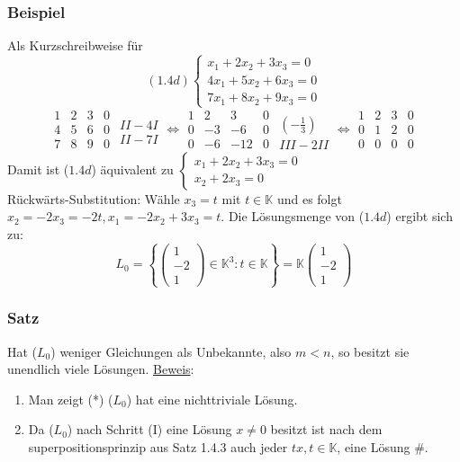 \subsubsection{Beispiel}
Als Kurzschreibweise für \[(1.4d)\begin{cases}x_1+2x_2+3x_3=0\\ 4x_1+5x_2+6x_3=0\\ 7x_1+8x_2+9x_3=0\end{cases}\]
\[\begin{array}{ccc|c}1 & 2 & 3 & 0\\ 4 & 5 & 6 & 0\\ 7 & 8 & 9 & 0\end{array} \begin{array}{c} \\ II - 4I\\ II-7I\end{array} \Leftrightarrow \begin{array}{ccc|c}1 & 2 & 3 & 0\\ 0 & -3 & -6 & 0\\ 0 & -6 & -12 & 0\end{array} \begin{array}{c} \\ (-\frac{1}{3})\\ III-2II\end{array} \Leftrightarrow \begin{array}{ccc|c}1 & 2 & 3 & 0\\ 0 & 1 & 2 & 0\\ 0 & 0 & 0 & 0\end{array}\]
Damit ist ($1.4d$) äquivalent zu $\begin{cases}x_1+2x_2+3x_3=0\\ x_2+2x_3=0\end{cases}$\\
Rückwärts-Substitution: Wähle $x_3=t$ mit $t\in\mathbb{K}$ und es folgt $x_2=-2x_3=-2t,x_1=-2x_2+3x_3=t$.  Die Lösungsmenge von ($1.4d$) ergibt sich zu:
\[ L_0=\left\{\left(\begin{array}{c}1\\ -2\\ 1\end{array}\right) \in \mathbb{K}^3:t\in\mathbb{K}\right\} = \mathbb{K}\left(\begin{array}{c}1\\ -2\\ 1\end{array}\right)\]
\subsubsection{Satz}
\label{1.4.8}
Hat ($L_0$) weniger Gleichungen als Unbekannte, also $m<n$, so besitzt sie unendlich viele Lösungen.
\underline{Beweis}:
\renewcommand{\labelenumi}{\Roman{enumi}.}
\begin{enumerate}
\item Man zeigt (*) ($L_0$) hat eine nichttriviale Lösung.
\item Da ($L_0$) nach Schritt (I) eine Lösung $x\not= 0$ besitzt ist nach dem superpositionsprinzip aus Satz 1.4.3 auch jeder $tx,t\in \mathbb{K}$, eine Lösung \#.
\end{enumerate}
